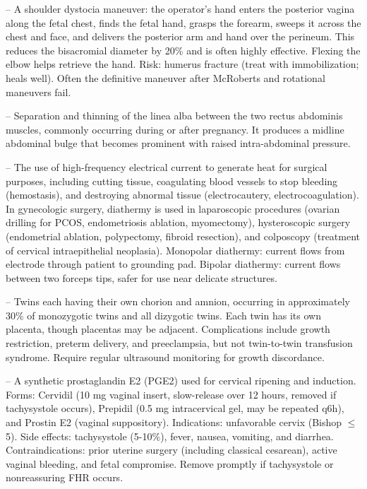 -- A shoulder dystocia maneuver: the operator's hand enters the posterior vagina along the fetal chest, finds the fetal hand, grasps the forearm, sweeps it across the chest and face, and delivers the posterior arm and hand over the perineum. This reduces the bisacromial diameter by 20\% and is often highly effective. Flexing the elbow helps retrieve the hand. Risk: humerus fracture (treat with immobilization; heals well). Often the definitive maneuver after McRoberts and rotational maneuvers fail.

-- Separation and thinning of the linea alba between the two rectus abdominis muscles, commonly occurring during or after pregnancy. It produces a midline abdominal bulge that becomes prominent with raised intra-abdominal pressure.

-- The use of high-frequency electrical current to generate heat for surgical purposes, including cutting tissue, coagulating blood vessels to stop bleeding (hemostasis), and destroying abnormal tissue (electrocautery, electrocoagulation). In gynecologic surgery, diathermy is used in laparoscopic procedures (ovarian drilling for PCOS, endometriosis ablation, myomectomy), hysteroscopic surgery (endometrial ablation, polypectomy, fibroid resection), and colposcopy (treatment of cervical intraepithelial neoplasia). Monopolar diathermy: current flows from electrode through patient to grounding pad. Bipolar diathermy: current flows between two forceps tips, safer for use near delicate structures.

-- Twins each having their own chorion and amnion, occurring in approximately 30\% of monozygotic twins and all dizygotic twins. Each twin has its own placenta, though placentas may be adjacent. Complications include growth restriction, preterm delivery, and preeclampsia, but not twin-to-twin transfusion syndrome. Require regular ultrasound monitoring for growth discordance.

-- A synthetic prostaglandin E2 (PGE2) used for cervical ripening and induction. Forms: Cervidil (10 mg vaginal insert, slow-release over 12 hours, removed if tachysystole occurs), Prepidil (0.5 mg intracervical gel, may be repeated q6h), and Prostin E2 (vaginal suppository). Indications: unfavorable cervix (Bishop \(\le\)5). Side effects: tachysystole (5-10\%), fever, nausea, vomiting, and diarrhea. Contraindications: prior uterine surgery (including classical cesarean), active vaginal bleeding, and fetal compromise. Remove promptly if tachysystole or nonreassuring FHR occurs.

